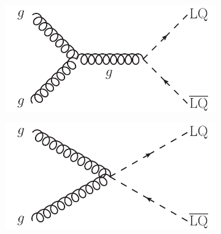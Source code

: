 \begin{figure}
  \begin{subfigure}[b]{0.45\textwidth}
    \includegraphics[width=\textwidth]{tex/theory/fig/LO_FD_LQ_pair_c}
    \caption{}
    \label{fig:feynman_LO_LQ_pair_c}
  \end{subfigure}
  \begin{subfigure}[b]{0.45\textwidth}
    \includegraphics[width=\textwidth]{tex/theory/fig/LO_FD_LQ_pair_d}
    \caption{}
    \label{fig:feynman_LO_LQ_pair_d}
  \end{subfigure}


\end{figure}
